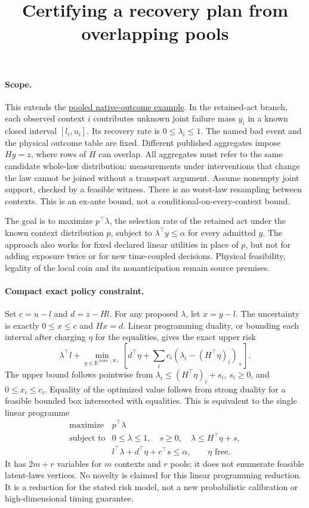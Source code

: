 \documentclass[11pt]{article}
\title{Certifying a recovery plan from overlapping pools}
\date{}
\begin{document}
\maketitle

\paragraph{Scope.}
This extends the \href{https://github.com/eternal-november/eos-research-programmes/pull/420}{pooled native-outcome example}. In the retained-act branch, each observed context $i$ contributes unknown joint failure mass $y_i$ in a known closed interval $[l_i,u_i]$. Its recovery rate is $0\leq\lambda_i\leq1$. The named bad event and the physical outcome table are fixed. Different published aggregates impose $Hy=z$, where rows of $H$ can overlap. All aggregates must refer to the same candidate whole-law distribution: measurements under interventions that change the law cannot be joined without a transport argument. Assume nonempty joint support, checked by a feasible witness. There is no worst-law resampling between contexts. This is an ex-ante bound, not a conditional-on-every-context bound.

The goal is to maximize $p^\top\lambda$, the selection rate of the retained act under the known context distribution $p$, subject to $\lambda^\top y\leq\alpha$ for every admitted $y$. The approach also works for fixed declared linear utilities in place of $p$, but not for adding exposure twice or for new time-coupled decisions. Physical feasibility, legality of the local coin and its nonanticipation remain source premises.

\paragraph{Compact exact policy constraint.}
Set $c=u-l$ and $d=z-Hl$. For any proposed $\lambda$, let $x=y-l$. The uncertainty is exactly $0\leq x\leq c$ and $Hx=d$. Linear programming duality, or bounding each interval after charging $\eta$ for the equalities, gives the exact upper risk
\[
 \lambda^\top l+
 \min_{\eta\in\mathbb R^{\operatorname{rows}(H)}}\!
 \left[d^\top\eta+\sum_i c_i(\lambda_i-(H^\top\eta)_i)_+\right].
\]
The upper bound follows pointwise from $\lambda_i\leq(H^\top\eta)_i+s_i$, $s_i\geq0$, and $0\leq x_i\leq c_i$. Equality of the optimized value follows from strong duality for a feasible bounded box intersected with equalities. This is equivalent to the single linear programme
\[
 \begin{array}{ll}
 \text{maximize}&p^\top\lambda\\
 \text{subject to}&0\leq\lambda\leq1,\quad s\geq0,\quad
                  \lambda\leq H^\top\eta+s,\\
 &l^\top\lambda+d^\top\eta+c^\top s\leq\alpha,\qquad
                  \eta\text{ free}.
 \end{array}
\]
It has $2m+r$ variables for $m$ contexts and $r$ pools; it does not enumerate feasible latent-laws vertices. No novelty is claimed for this linear programming reduction. It is a reduction for the stated risk model, not a new probabilistic calibration or high-dimensional timing guarantee.
\end{document}
